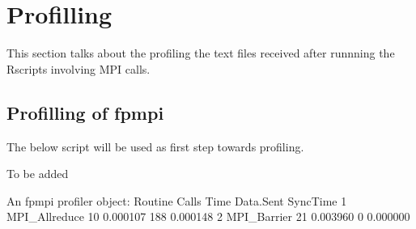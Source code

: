 \section{Profilling}
This section talks about the profiling the text files received after runnning the Rscripts 
involving MPI calls.

\subsection{Profilling of fpmpi}
The below script will be used as first step towards profiling.
\begin{Code}
To be added 
\end{Code}
\begin{Output}
An fpmpi profiler object:
        Routine Calls     Time Data.Sent SyncTime
1 MPI_Allreduce    10 0.000107       188 0.000148
2   MPI_Barrier    21 0.003960         0 0.000000

\end{Output}


